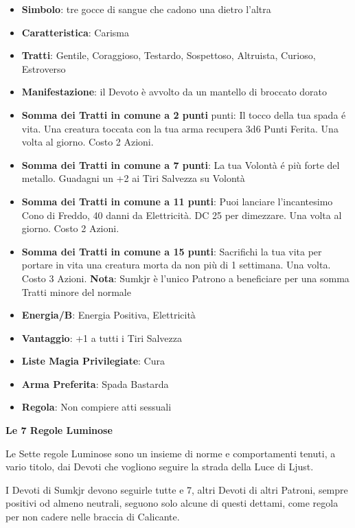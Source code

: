 \begin{multicols}{2}
\begin{itemize}[leftmargin=*] \setlength{\itemsep}{0pt}
\item \textbf{Simbolo}: tre gocce di sangue che cadono una dietro l'altra
\item \textbf{Caratteristica}: Carisma
\item \textbf{Tratti}: Gentile, Coraggioso, Testardo, Sospettoso, Altruista, Curioso, Estroverso
\item \textbf{Manifestazione}: il Devoto è avvolto da un mantello di broccato dorato
\item \textbf{Somma dei Tratti in comune a 2 punti} punti: Il tocco della tua spada é vita. Una creatura toccata con la tua arma recupera 3d6 Punti Ferita. Una volta al giorno. Costo 2 Azioni.
\item \textbf{Somma dei Tratti in comune a 7 punti}: La tua Volontà é più forte del metallo. Guadagni un +2 ai Tiri Salvezza su Volontà
\item \textbf{Somma dei Tratti in comune a 11 punti}: Puoi lanciare l'incantesimo Cono di Freddo, 40 danni da Elettricità. DC 25 per dimezzare. Una volta al giorno. Costo 2 Azioni.
\item \textbf{Somma dei Tratti in comune a 15 punti}: Sacrifichi la tua vita per portare in vita una creatura morta da non più di 1 settimana. Una volta. Costo 3 Azioni.
\textbf{Nota}: Sumkjr è l'unico Patrono a beneficiare per una somma Tratti minore del normale
\item \textbf{Energia/B}: Energia Positiva, Elettricità
\item \textbf{Vantaggio}: +1 a tutti i Tiri Salvezza
\item \textbf{Liste Magia Privilegiate}: Cura
\item \textbf{Arma Preferita}: Spada Bastarda
\item \textbf{Regola}: Non compiere atti sessuali
\end{itemize}

\textbf{Le 7 Regole Luminose}

Le Sette regole Luminose sono un insieme di norme e comportamenti tenuti, a vario titolo, dai Devoti che vogliono seguire la strada della Luce di Ljust.

I Devoti di Sumkjr devono seguirle tutte e 7, altri Devoti di altri Patroni, sempre positivi od almeno neutrali, seguono solo alcune di questi dettami, come regola per non cadere nelle braccia di Calicante.


\end{multicols}

